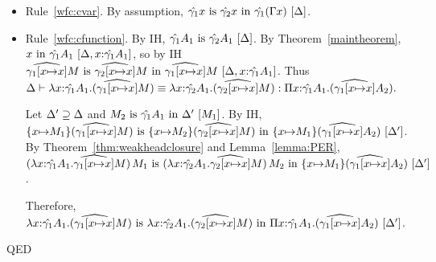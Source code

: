 \documentclass{article}
\theoremstyle{break}
\newcommand{\qed}{\mbox{QED}}
\newcommand{\env}{\gamma}
\newcommand{\envone}{\hat{\env_1}}
\newcommand{\envtwo}{\hat{\env_2}}
\newcommand{\envonex}{\widehat{\env_1[\cvar{\mapsto}\cvar]}}
\newcommand{\envtwox}{\widehat{\env_2[\cvar{\mapsto}\cvar]}}
\newenvironment{proof}{\noindent{\bf Proof:}\hspace*{0.5em}}{\hspace*{\fill}\qed}
\begin{document}
\begin{proof}
\begin{itemize}
\item Rule~\ref{wfc:cvar}.
By assumption,
$\semanticequivterm{\world}{\hat{\env_1}\cvar}{\hat{\env_2}\cvar}{\hat{\env_1}(\context\cvar)}$.

\item Rule~\ref{wfc:cfunction}.
By IH, $\semanticequivtype{\world}{\envone\kind_1}{\envtwo\kind_1}$.
By Theorem~\ref{maintheorem},
$\semanticvalidterm{\world,\cvar{:}\envone\kind_1}{\cvar}{\envone\kind_1}$, so by IH
$\semanticequivterm{\world,\cvar{:}\envone\kind_1}{\envonex\constructor}
    {\envtwox\constructor}{\envonex\constructor}$.
Thus
$\equivconstructor{\world}{\cfunction{\cvar}{\envone\kind_1}{(\envonex\constructor)}}
    {\cfunction{\cvar}{\envtwo\kind_1}{(\envtwox\constructor)}}
    {\kpi{\cvar}{\envone\kind_1}{(\envonex\kind_2)}}.$

Let $\Delta'\supseteq\Delta$ and 
$\semanticequivterm{\constructor_1}{\constructor_2}{\envone\kind_1}{\world'}$.
By IH, 
$\semanticequivterm{\world'}
  {\substitute{\cvar}{\constructor_1}{(\envonex\constructor)}}
  {\substitute{\cvar}{\constructor_2}{(\envtwox\constructor)}}
  {\substitute{\cvar}{\constructor_1}{(\envonex\kind_2)}}$. %
By Theorem~\ref{thm:weakheadclosure} and Lemma~\ref{lemma:PER}, 
$\semanticequivterm{\world'}
  {\capply{(\cfunction{\cvar}{\envone\kind_1}{\envonex\constructor})}{\constructor_1}}
  {\capply{(\cfunction{\cvar}{\envtwo\kind_1}{\envtwox\constructor})}{\constructor_2}}
  {\substitute{\cvar}{\constructor_1}{(\envonex\kind_2)}}$. %

Therefore,
$\semanticequivterm{\world'}
  {\cfunction{\cvar}{\envone\kind_1}{(\envonex\constructor)}}
  {\cfunction{\cvar}{\envtwo\kind_1}{(\envtwox\constructor)}}
  {\kpi{\cvar}{\envone\kind_1}{(\envonex\kind_2)}}$.


\end{itemize}
\end{proof}
\end{document}
